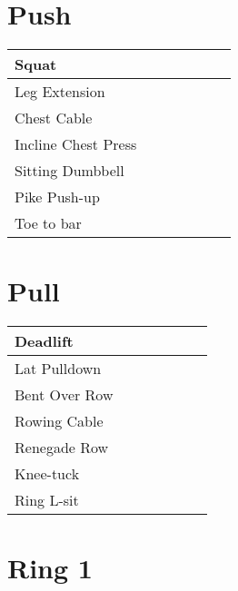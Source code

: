 \documentclass{article}
\begin{document}
\begin{landscape}



\section*{Push}

\huge
\noindent\begin{tabularx}{\columnwidth}{ |l|*{6}{R|} }
  \hline
  Squat                            &&&&&&    \\
  \hline
  Leg Extension                    &&&&&&    \\
  \hline
  Chest Cable                      &&&&&&    \\
  \hline
  Incline Chest Press              &&&&&&    \\
  \hline
  Sitting Dumbbell                 &&&&&&    \\
  \hline
  Pike Push-up                     &&&&&&    \\
  \hline
  Toe to bar                       &&&&&&    \\
  \hline
\end{tabularx}



\section*{Pull}

\noindent\begin{tabularx}{\columnwidth}{ |l|*{6}{R|} }
  \hline
  Deadlift                         &&&&&&    \\
  \hline
  Lat Pulldown                     &&&&&&    \\
  \hline
  Bent Over Row                    &&&&&&    \\
  \hline
  Rowing Cable                     &&&&&&    \\
  \hline
  Renegade Row                     &&&&&&    \\
  \hline
  Knee-tuck                        &&&&&&    \\
  \hline
  Ring L-sit                       &&&&&&    \\
  \hline
\end{tabularx}



\section*{Ring 1}


\end{landscape}
\end{document}
